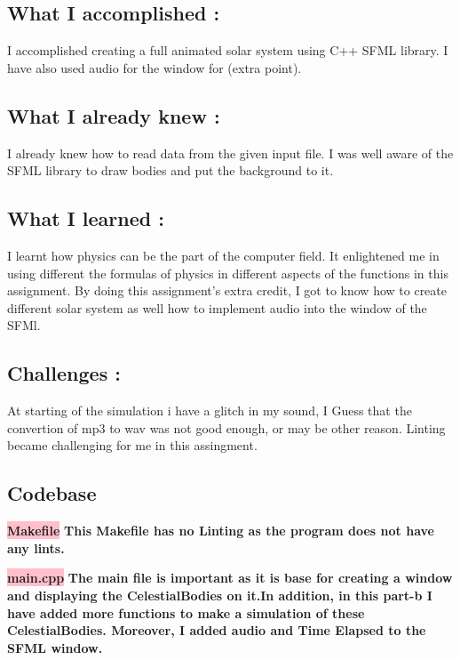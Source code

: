 \subsection{What I accomplished :}

I accomplished creating a full animated solar system using C++ SFML library. I have also used audio for the window for (extra point).

\subsection{What I already knew :}

I already knew how to read data from the given input file. I was well aware of the SFML library to draw bodies and put the background to it.

\subsection{What I learned :}

I learnt how physics can be the part of the computer field. It enlightened me in using different the formulas of physics in different aspects of the functions in this assignment. By doing this assignment's extra credit, I got to know how to create different solar system as well how to implement audio into the window of the SFMl.

\subsection{Challenges :}
       At starting of the simulation i have a glitch in my sound, I Guess that the convertion of mp3 to wav was not good enough, or may be other reason.
       Linting became challenging for me in this assingment.

\subsection{Codebase}\label{sec:ps3b:code}

\textbf{\colorbox{pink}{Makefile}} \newline \textbf{This Makefile has no Linting as the program does not have any lints.}


\textbf{\colorbox{pink}{main.cpp}} \newline \textbf{The main file is important as it is base for creating a window and displaying the CelestialBodies on it.In addition, in this part-b I have added more functions to make a simulation of these CelestialBodies. Moreover, I added audio and Time Elapsed to the SFML window.}


